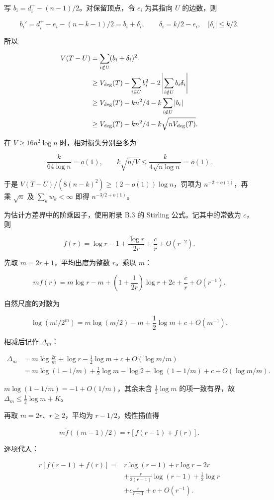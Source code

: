 \documentclass[11pt,a4paper]{article}
\begin{document}
写 \(b_i=d_i^+-(n-1)/2\)。对保留顶点，令 \(e_i\) 为其指向 \(U\) 的边数，则

\[
b_i'=d_i^+-e_i-(n-k-1)/2=b_i+\delta_i,
\qquad\delta_i=k/2-e_i,\quad |\delta_i|\le k/2.
\]

所以

\[
\begin{aligned}
V(T-U)&=\sum_{i\notin U}(b_i+\delta_i)^2\\
&\ge V_{\rm deg}(T)-\sum_{i\in U}b_i^2-2\left|\sum_{i\notin U}b_i\delta_i\right|\\
&\ge V_{\rm deg}(T)-kn^2/4-k\sum_{i\notin U}|b_i|\\
&\ge V_{\rm deg}(T)-kn^2/4-k\sqrt{nV_{\rm deg}(T)}.
\end{aligned}
\]

在 \(V\ge16n^2\log n\) 时，相对损失分别至多为

\[
\frac{k}{64\log n}=o(1),\qquad
k\sqrt{n/V}\le\frac{k}{4\sqrt{n\log n}}=o(1).
\]

于是 \(V(T-U)/(8(n-k)^2)\ge(2-o(1))\log n\)，罚项为 \(n^{-2+o(1)}\)，再乘 \(\sqrt n\) 及 \(\sum_kw_k<\infty\) 即得 \(n^{-3/2+o(1)}\)。

为估计方差界中的阶乘因子，使用附录 B.3 的 Stirling 公式。记其中的常数为 \(c\)，则

\[
f(r)=\log r-1+\frac{\log r}{2r}+\frac cr+O(r^{-2}).
\]

先取 \(m=2r+1\)，平均出度为整数 \(r\)。乘以 \(m\)：

\[
mf(r)=m\log r-m+\left(1+\frac1{2r}\right)\log r
+2c+\frac cr+O(r^{-1}).
\]

自然尺度的对数为

\[
\log(m!/2^m)=m\log(m/2)-m+\frac12\log m+c+O(m^{-1}).
\]

相减后记作 \(\Delta_m\)：

\[
\begin{aligned}
\Delta_m
&=m\log\frac{2r}{m}+\log r-\frac12\log m
+c+O(\log m/m)\\
&=m\log(1-1/m)+\frac12\log m-\log2
+\log(1-1/m)+c+O(\log m/m).
\end{aligned}
\]

\(m\log(1-1/m)=-1+O(1/m)\)，其余未含 \(\frac12\log m\) 的项一致有界，故 \(\Delta_m\le\frac12\log m+K\)。

再取 \(m=2r\)、\(r\ge2\)，平均为 \(r-1/2\)，线性插值得

\[
m\widetilde f((m-1)/2)=r[f(r-1)+f(r)].
\]

逐项代入：

\[
\begin{aligned}
r[f(r-1)+f(r)]
={}&r\log(r-1)+r\log r-2r\\
&+\frac r{2(r-1)}\log(r-1)+\frac12\log r\\
&+c\frac r{r-1}+c+O(r^{-1}).
\end{aligned}
\]
\end{document}
